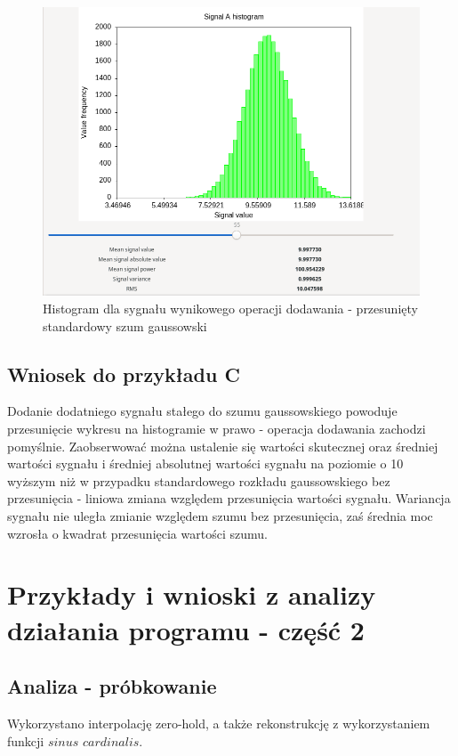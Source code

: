 \documentclass{article}
\begin{document}
\newpage
\begin{figure}[h!]
 \centering
 \includegraphics[width=14cm]{shifted_gauss_hist.png}
 \vspace{-0.3cm}
 \caption{Histogram dla sygnału wynikowego operacji dodawania - przesunięty standardowy szum gaussowski}
 \label{fig:shifted_gauss_hist}
\end{figure}
\newpage
\subsection{Wniosek do przykładu C}
Dodanie dodatniego sygnału stałego do szumu gaussowskiego powoduje przesunięcie wykresu na histogramie w prawo - operacja dodawania zachodzi pomyślnie. Zaobserwować można ustalenie się wartości skutecznej oraz średniej wartości sygnału i średniej absolutnej wartości sygnału na poziomie o 10 wyższym niż w przypadku standardowego rozkładu gaussowskiego bez przesunięcia - liniowa zmiana względem przesunięcia wartości sygnału. Wariancja sygnału nie uległa zmianie względem szumu bez przesunięcia, zaś średnia moc wzrosła o kwadrat przesunięcia wartości szumu.

\section{Przykłady i wnioski z analizy działania programu - część 2}
\subsection{Analiza - próbkowanie}
Wykorzystano interpolację zero-hold, a także rekonstrukcję z wykorzystaniem funkcji $sinus$ $cardinalis$.
\end{document}
